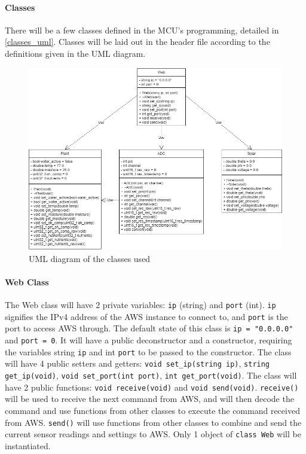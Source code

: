 \paragraph{Classes}
There will be a few classes defined in the MCU's programming, detailed
in \autoref{classes_uml}. Classes will be laid out in the header file
according to the definitions given in the UML diagram.
\begin{figure}[H]
    \caption{UML diagram of the classes used}
    \label{classes_uml}
    \centering
    \includegraphics[width=\textwidth]{images/classes_uml.png}
\end{figure}

\paragraph{Web Class}
The Web class will have 2 private variables: \texttt{ip} (string) and
\texttt{port} (int). \texttt{ip} signifies the IPv4 address of the AWS instance
to connect to, and \texttt{port} is the port to access AWS through. The default
state of this class is \texttt{ip = "0.0.0.0"} and \texttt{port = 0}. It will
have a public deconstructor and a constructor, requiring the variables string
\texttt{ip} and int \texttt{port} to be passed to the constructor. The class
will have 4 public setters and getters: \texttt{void set\_ip(string ip)},
\texttt{string get\_ip(void)}, \texttt{void set\_port(int port)}, 
\texttt{int get\_port(void)}. The class will have 2 public functions:
\texttt{void receive(void)} and \texttt{void send(void)}.
\texttt{receive()} will be used to receive the next command from AWS, and
will then decode the command and use functions from other classes to execute
the command received from AWS. \texttt{send()} will use functions from
other classes to combine and send the current sensor readings and settings to
AWS. Only 1 object of \texttt{class Web} will be instantiated.

